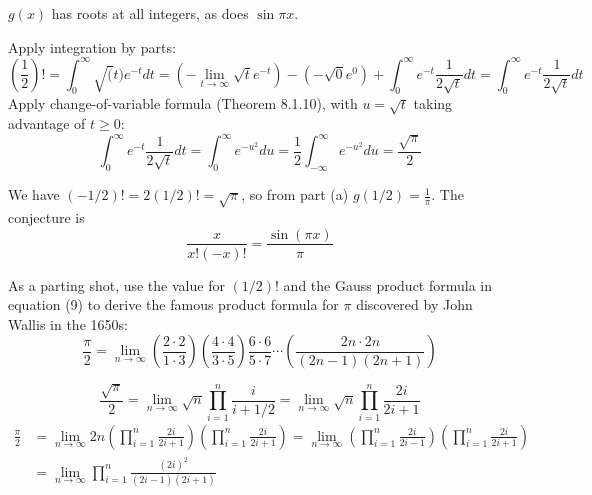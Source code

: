 \begin{exercise}
\end{exercise}
\begin{solution}
\item \(g(x)\) has roots at all integers, as does \(\sin \pi x\).
\item Apply integration by parts:
\[\left(\frac{1}{2}\right)! = \int_0^\infty \sqrt(t) e^{-t} dt = \left(-\lim_{t \to \infty} \sqrt{t} e^{-t}\right) - (-\sqrt{0} e^{0}) + \int_0^\infty e^{-t} \frac{1}{2\sqrt{t}} dt = \int_0^\infty e^{-t} \frac{1}{2 \sqrt{t}} dt \]
Apply change-of-variable formula (Theorem 8.1.10), with \(u = \sqrt{t}\) taking advantage of \(t \geq 0\):
\[\int_0^\infty e^{-t} \frac{1}{2\sqrt{t}}dt = \int_0^\infty e^{-u^2} du = \frac{1}{2}\int_{-\infty}^\infty e^{-u^2} du = \frac{\sqrt{\pi}}{2}\]
\item We have \((-1/2)! = 2 (1/2)! = \sqrt{\pi}\), so from part (a) \(g(1/2) = \frac{1}{\pi}\). The conjecture is
\[\frac{x}{x! (-x)!} = \frac{\sin(\pi x)}{\pi}\]
\end{solution}

\begin{exercise}
As a parting shot, use the value for \((1/2)!\) and the Gauss product formula in equation (9) to derive the famous product formula for \(\pi\) discovered by John Wallis in the 1650s:
\[\frac{\pi}{2} = \lim_{n \to \infty} \left(\frac{2 \cdot 2}{1 \cdot 3}\right) \left(\frac{4 \cdot 4}{3 \cdot 5}\right) \frac{6 \cdot 6 }{5 \cdot 7} \cdots \left(\frac{2n \cdot 2n}{(2n-1)(2n+1)}\right)\]
\end{exercise}
\begin{solution}
\[\frac{\sqrt{\pi}}{2} = \lim_{n \to \infty} \sqrt{n} \prod^n_{i=1} \frac{i}{i + 1/2} = \lim_{n \to \infty} \sqrt{n} \prod^n_{i=1} \frac{2i}{2i + 1}\]
\[ \begin{aligned}
    \frac{\pi}{2} &= \lim_{n \to \infty} 2n \left(\prod^n_{i = 1} \frac{2i}{2i + 1}\right)\left(\prod^n_{i = 1} \frac{2i}{2i + 1}\right) = \lim_{n \to \infty} \left(\prod^n_{i = 1} \frac{2i}{2i - 1}\right)\left(\prod^n_{i = 1} \frac{2i}{2i + 1}\right)  \\
&= \lim_{n \to \infty} \prod^n_{i=1} \frac{(2i)^2}{(2i-1)(2i+1)}
\end{aligned}
\]
\end{solution}
